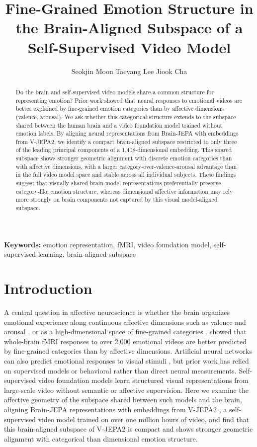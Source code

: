\documentclass[extended-abstract]{ccn}
\title{Fine-Grained Emotion Structure in the Brain-Aligned Subspace of a Self-Supervised Video Model}
\author{%
  Seokjin Moon\affmark{1} \And
  Taeyang Lee\affmark{2} \And
  Jiook Cha\affmark{1,2}%
}
\affiliation{1}{Department of Brain and Cognitive Sciences, Seoul National University}
\affiliation{2}{Department of Psychology, Seoul National University}
\begin{document}
\maketitle

\begin{abstract}
  Do the brain and self-supervised video models share a common structure for representing emotion?
  Prior work showed that neural responses to emotional videos are better explained by fine-grained emotion categories than by affective dimensions (valence, arousal).
  We ask whether this categorical structure extends to the subspace shared between the human brain and a video foundation model trained without emotion labels.
  By aligning neural representations from Brain-JEPA with embeddings from V-JEPA2, we identify a compact brain-aligned subspace restricted to only three of the leading principal components of a 1{,}408-dimensional embedding.
  This shared subspace shows stronger geometric alignment with discrete emotion categories than with affective dimensions, with a larger category-over-valence-arousal advantage than in the full video model space and stable across all individual subjects.
  These findings suggest that visually shared brain-model representations preferentially preserve category-like emotion structure, whereas dimensional affective information may rely more strongly on brain components not captured by this visual model-aligned subspace.
\end{abstract}

\textbf{Keywords:} emotion representation, fMRI, video foundation model, self-supervised learning, brain-aligned subspace

\section{Introduction}

A central question in affective neuroscience is whether the brain organizes emotional experience along continuous affective dimensions such as valence and arousal \citep{Russell1980}, or as a high-dimensional space of fine-grained categories \citep{CowenKeltner2017}.
\citet{Horikawa2020} showed that whole-brain fMRI responses to over 2{,}000 emotional videos are better predicted by fine-grained categories than by affective dimensions.
Artificial neural networks can also predict emotional responses to visual stimuli \citep{Kragel2019,Conwell2025}, but prior work has relied on supervised models or behavioral rather than direct neural measurements.
Self-supervised video foundation models learn structured visual representations from large-scale video without semantic or affective supervision.
Here we examine the affective geometry of the subspace shared between such models and the brain, aligning Brain-JEPA \citep{Dong2024} representations with embeddings from V-JEPA2 \citep{Assran2025}, a self-supervised video model trained on over one million hours of video, and find that this brain-aligned subspace of V-JEPA2 is compact and shows stronger geometric alignment with categorical than dimensional emotion structure.
\end{document}
